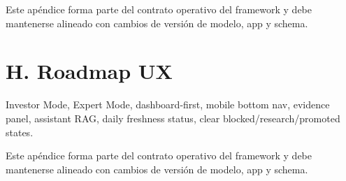\documentclass[11pt,letterpaper]{article}
\begin{document}
Este apéndice forma parte del contrato operativo del framework y debe mantenerse alineado con cambios de versión de modelo, app y schema.

\section{H. Roadmap UX}
Investor Mode, Expert Mode, dashboard-first, mobile bottom nav, evidence panel, assistant RAG, daily freshness status, clear blocked/research/promoted states.

Este apéndice forma parte del contrato operativo del framework y debe mantenerse alineado con cambios de versión de modelo, app y schema.
\end{document}
